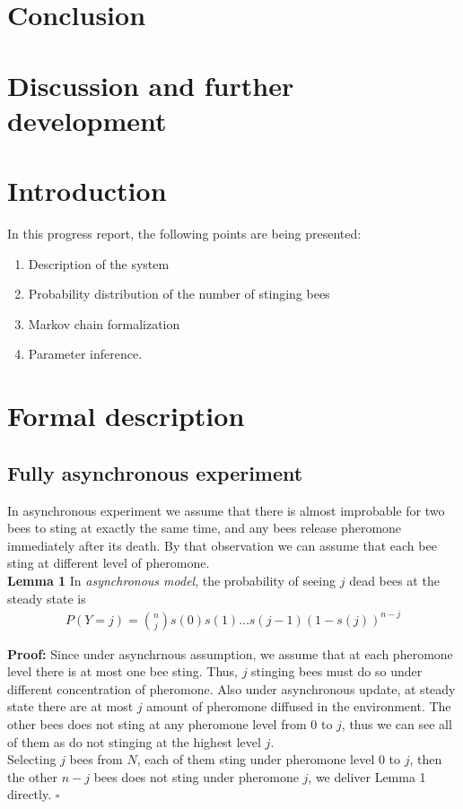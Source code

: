 \documentclass[12pt]{article}
\newcommand*{\QED}{\hfill\ensuremath{\square}}
\begin{document}
\section{Conclusion}








\section{Discussion and further development}



\section{Introduction}
In this progress report, the following points are being presented:
\begin{enumerate}
\item Description of the system
\item Probability distribution of the number of stinging bees
\item Markov chain formalization
\item Parameter inference.
\end{enumerate}

\section{Formal description}

\subsection{Fully asynchronous experiment}
In asynchronous experiment we assume that there is almost improbable for two
bees to sting at exactly the same time, and any bees release pheromone
immediately after its death. By that observation we can assume that each bee
sting at different level of pheromone.\\

\textbf{Lemma 1} In \textit{asynchronous model}, the probability of seeing $j$
dead bees at the steady state is
\begin{align}
  P(Y=j) = {n\choose j}s(0)s(1)\ldots s(j-1)(1 - s(j))^{n-j} 
\end{align}

\textbf{Proof:} Since under asynchrnous assumption, we assume that at each
pheromone level there is at most one bee sting. Thus, $j$ stinging bees must do
so under different concentration of pheromone. Also under asynchronous update,
at steady state there are at most $j$ amount of pheromone diffused in the
environment. The other bees does not sting at any pheromone level from $0$ to
$j$, thus we can see all of them as do not stinging at the highest level $j$.\\
Selecting $j$ bees from $N$, each of them sting under pheromone level $0$ to
$j$, then the other $n-j$ bees does not sting under pheromone $j$, we deliver
Lemma 1 directly. \QED
\end{document}

